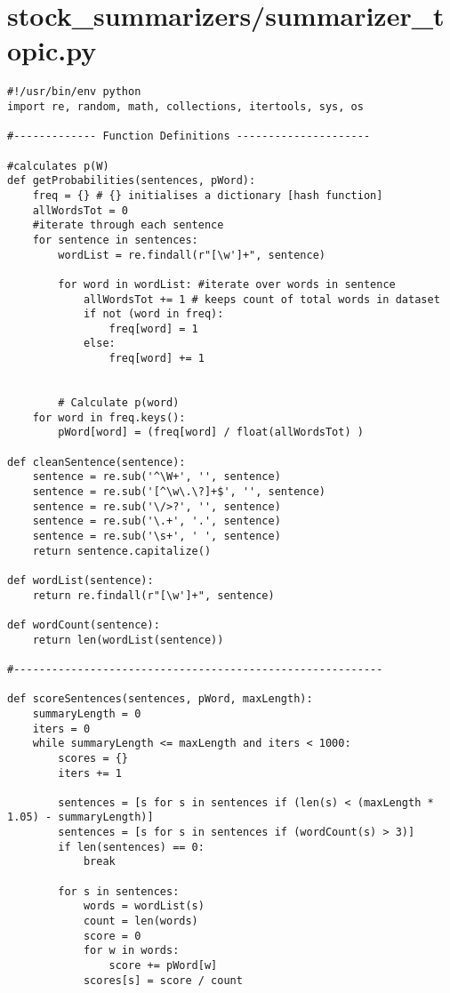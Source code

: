 \documentclass{article}
\begin{document}
\section*{stock\_summarizers/summarizer\_topic.py}
\begin{verbatim}
#!/usr/bin/env python
import re, random, math, collections, itertools, sys, os

#------------- Function Definitions ---------------------

#calculates p(W)
def getProbabilities(sentences, pWord):
    freq = {} # {} initialises a dictionary [hash function]
    allWordsTot = 0
    #iterate through each sentence
    for sentence in sentences:
        wordList = re.findall(r"[\w']+", sentence)

        for word in wordList: #iterate over words in sentence
            allWordsTot += 1 # keeps count of total words in dataset
            if not (word in freq):
                freq[word] = 1
            else:
                freq[word] += 1


        # Calculate p(word)
    for word in freq.keys():
        pWord[word] = (freq[word] / float(allWordsTot) )

def cleanSentence(sentence):
    sentence = re.sub('^\W+', '', sentence)
    sentence = re.sub('[^\w\.\?]+$', '', sentence)
    sentence = re.sub('\/>?', '', sentence)
    sentence = re.sub('\.+', '.', sentence)
    sentence = re.sub('\s+', ' ', sentence)
    return sentence.capitalize()

def wordList(sentence):
    return re.findall(r"[\w']+", sentence)

def wordCount(sentence):
    return len(wordList(sentence))

#----------------------------------------------------------

def scoreSentences(sentences, pWord, maxLength):
    summaryLength = 0
    iters = 0
    while summaryLength <= maxLength and iters < 1000:
        scores = {}
        iters += 1

        sentences = [s for s in sentences if (len(s) < (maxLength * 1.05) - summaryLength)]
        sentences = [s for s in sentences if (wordCount(s) > 3)]
        if len(sentences) == 0:
            break

        for s in sentences:
            words = wordList(s)
            count = len(words)
            score = 0
            for w in words:
                score += pWord[w]
            scores[s] = score / count


\end{verbatim}
\end{document}

